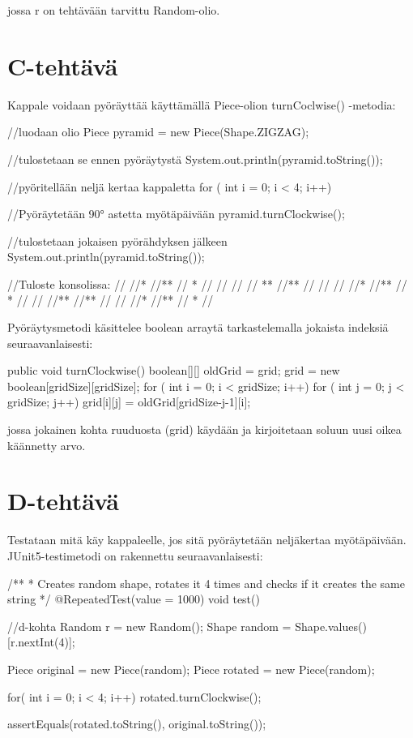 jossa r on tehtävään tarvittu Random-olio.

\section{C-tehtävä}

\label{C-tehtävä}

Kappale voidaan pyöräyttää käyttämällä Piece-olion turnCoclwise() -metodia:

\begin{javacode}
//luodaan olio
Piece pyramid = new Piece(Shape.ZIGZAG);

//tulostetaan se ennen pyöräytystä
System.out.println(pyramid.toString());

//pyöritellään neljä kertaa kappaletta
for ( int i = 0; i < 4; i++) {
	//Pyöräytetään 90° astetta myötäpäivään
	pyramid.turnClockwise();
	
	//tulostetaan jokaisen pyörähdyksen jälkeen
	System.out.println(pyramid.toString());
}
//Tuloste konsolissa:
//
//*  
//** 
// * 
//   
//
//   
// **
//** 
//   
//
//   
//*  
//** 
// * 
//
//   
//** 
//**  
//   
//
//*  
//** 
// * 
//  
\end{javacode}

Pyöräytysmetodi käsittelee boolean arraytä tarkastelemalla jokaista indeksiä
seuraavanlaisesti:

\begin{javacode}
	public void turnClockwise() {
		boolean[][] oldGrid = grid;
		grid = new boolean[gridSize][gridSize];
		for ( int i = 0; i < gridSize; i++) {
			for ( int j = 0; j < gridSize; j++) {
				grid[i][j] = oldGrid[gridSize-j-1][i];
			}
		}
	}
\end{javacode}

jossa jokainen kohta ruuduosta (grid) käydään ja kirjoitetaan soluun uusi oikea
käännetty arvo.

\section{D-tehtävä}

\label{D-tehtävä}

Testataan mitä käy kappaleelle, jos sitä pyöräytetään neljäkertaa myötäpäivään.
JUnit5-testimetodi on rakennettu seuraavanlaisesti:

\begin{javacode}
/**
 * Creates random shape, rotates it 4 times and checks if it creates the same string
 */
@RepeatedTest(value = 1000)
void test() {
	//d-kohta
	Random r = new Random();
	Shape random = Shape.values()[r.nextInt(4)];
	
	Piece original = new Piece(random);
	Piece rotated = new Piece(random);
	
	for( int i = 0; i < 4; i++) {
		rotated.turnClockwise();
	}
	
	assertEquals(rotated.toString(), original.toString());
}
\end{javacode}

